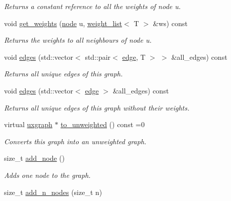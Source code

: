 \begin{DoxyCompactItemize}
\begin{DoxyCompactList}\small\item\em Returns a constant reference to all the weights of node {\itshape u}. \end{DoxyCompactList}\item 
void \hyperlink{classlgraph_1_1wxgraph_a423a6e9eb99fd40d9aae73e7ff5adca9}{get\+\_\+weights} (\hyperlink{namespacelgraph_a397169dd66adf725210a30fb7251773e}{node} u, \hyperlink{namespacelgraph_a1e0fd5ef0a78b2a92da48adbed265cb6}{weight\+\_\+list}$<$ T $>$ \&ws) const
\begin{DoxyCompactList}\small\item\em Returns the weights to all neighbours of node {\itshape u}. \end{DoxyCompactList}\item 
void \hyperlink{classlgraph_1_1wxgraph_a1b89f56544185e33d54e72a8ed19a789}{edges} (std\+::vector$<$ std\+::pair$<$ \hyperlink{namespacelgraph_a76bd7d50719f03de7a85db259d80d572}{edge}, T $>$ $>$ \&all\+\_\+edges) const
\begin{DoxyCompactList}\small\item\em Returns all unique edges of this graph. \end{DoxyCompactList}\item 
void \hyperlink{classlgraph_1_1wxgraph_ae99b335ca0cc70f619ae7c186d2dc7ac}{edges} (std\+::vector$<$ \hyperlink{namespacelgraph_a76bd7d50719f03de7a85db259d80d572}{edge} $>$ \&all\+\_\+edges) const
\begin{DoxyCompactList}\small\item\em Returns all unique edges of this graph without their weights. \end{DoxyCompactList}\item 
virtual \hyperlink{classlgraph_1_1uxgraph}{uxgraph} $\ast$ \hyperlink{classlgraph_1_1wxgraph_a7fcd56f02a50591ba3ce5e5c7792b4aa}{to\+\_\+unweighted} () const =0
\begin{DoxyCompactList}\small\item\em Converts this graph into an unweighted graph. \end{DoxyCompactList}\item 
size\+\_\+t \hyperlink{classlgraph_1_1xxgraph_a6cb21d5e52afbb438a3e6643998c40cf}{add\+\_\+node} ()
\begin{DoxyCompactList}\small\item\em Adds one node to the graph. \end{DoxyCompactList}\item 
size\+\_\+t \hyperlink{classlgraph_1_1xxgraph_a8dd24aa48d55dfceaa87e47c32ae914a}{add\+\_\+n\+\_\+nodes} (size\+\_\+t n)

\end{DoxyCompactItemize}
